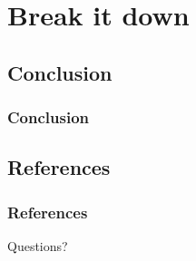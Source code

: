 \documentclass{beamer}
\begin{document}
\section{Break it down}

	\subsection{Conclusion}
	\begin{frame}
		\frametitle{Conclusion}
	\end{frame}

	\subsection{References}
	\begin{frame}[allowframebreaks]
		\frametitle{References}
		
		
	\end{frame}

	\begin{frame}
	\Huge{\centerline{Questions?}}
	\end{frame}
\end{document}
